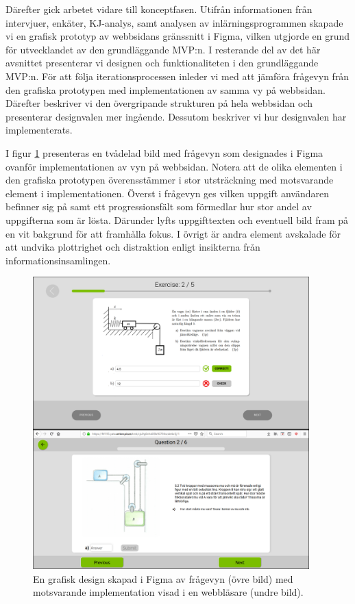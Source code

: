 Därefter gick arbetet vidare till konceptfasen. Utifrån informationen från intervjuer, enkäter, KJ-analys, samt analysen av inlärningsprogrammen skapade vi en grafisk prototyp av webbsidans gränssnitt i Figma, vilken utgjorde en grund för utvecklandet av den grundläggande MVP:n. I resterande del av det här avsnittet presenterar vi designen och funktionaliteten i den grundläggande MVP:n. För att följa iterationsprocessen inleder vi med att jämföra frågevyn från den grafiska prototypen med implementationen av samma vy på webbsidan. Därefter beskriver vi den övergripande strukturen på hela webbsidan och presenterar designvalen mer ingående. Dessutom beskriver vi hur designvalen har implementerats.

I figur \ref{fig:raket2} presenteras en tvådelad bild med frågevyn som designades i Figma ovanför implementationen av vyn på webbsidan. Notera att de olika elementen i den grafiska prototypen överensstämmer i stor utsträckning med motsvarande element i implementationen. Överst i frågevyn ges vilken uppgift användaren befinner sig på samt ett progressionsfält som förmedlar hur stor andel av uppgifterna som är lösta. Därunder lyfts uppgifttexten och eventuell bild fram på en vit bakgrund för att framhålla fokus. I övrigt är andra element avskalade för att undvika plottrighet och distraktion enligt insikterna från informationsinsamlingen. 

\begin{figure}[hbtp]
    \centering
    \includegraphics[width=0.95\textwidth]{images/resultpictures/figmaweb2.png}
    \caption{En grafisk design skapad i Figma av frågevyn (övre bild) med motsvarande implementation visad i en webbläsare (undre bild).}
    \label{fig:raket2}
\end{figure}

